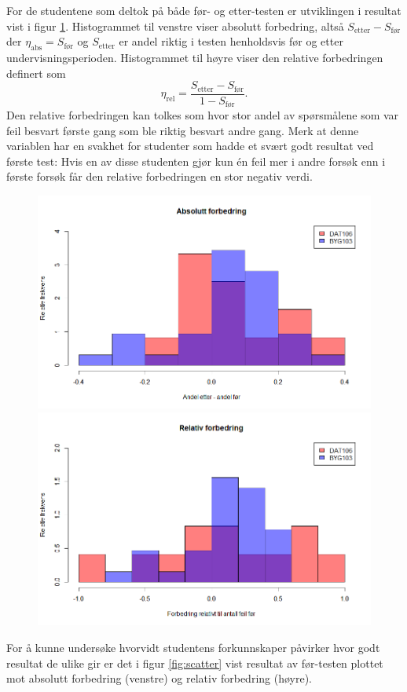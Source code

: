 \documentclass[a4paper,norsk,12pt]{report}
\begin{document}
For de studentene som deltok på både før- og etter-testen er utviklingen i resultat vist i figur \ref{fig:forbedring}. Histogrammet til venstre viser absolutt forbedring, altså $S_\text{etter}-S_\text{før}$ der $\eta_\text{abs} = S_\text{før}$ og $S_\text{etter}$ er andel riktig i testen henholdsvis før og etter undervisningsperioden. Histogrammet til høyre viser den relative forbedringen definert som
\begin{displaymath}
	\eta_\text{rel} = \frac{S_\text{etter}-S_\text{før}}{1 - S_\text{før}}.
\end{displaymath}
Den relative forbedringen kan tolkes som hvor stor andel av spørsmålene som var feil besvart første gang som ble riktig besvart andre gang. Merk at denne variablen har en svakhet for studenter som hadde et svært godt resultat ved første test: Hvis en av disse studenten gjør kun \'en feil mer i andre forsøk enn i første forsøk får den relative forbedringen en stor negativ verdi.
\begin{figure}[p]
	\includegraphics[width=.48\textwidth]{./absForbedring}
	\includegraphics[width=.48\textwidth]{./relForbedring}
	\caption{}
	\label{fig:forbedring}
\end{figure}
For å kunne undersøke hvorvidt studentens forkunnskaper påvirker hvor godt resultat de ulike gir er det i figur \ref{fig:scatter} vist resultat av før-testen plottet mot absolutt forbedring (venstre) og relativ forbedring (høyre). 
\end{document}
